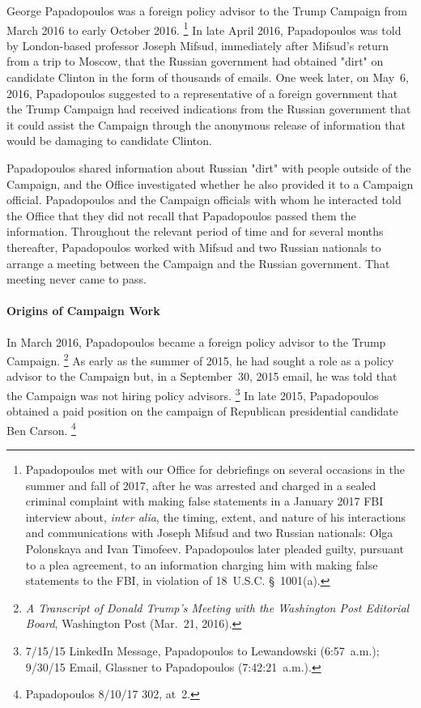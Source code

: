 George Papadopoulos was a foreign policy advisor to the Trump Campaign from March 2016 to early October 2016.%
\footnote{Papadopoulos met with our Office for debriefings on several occasions in the summer and fall of 2017, after he was arrested and charged in a sealed criminal complaint with making false statements in a January 2017 FBI interview about, \textit{inter alia}, the timing, extent, and nature of his interactions and communications with Joseph Mifsud and two Russian nationals: Olga Polonskaya and Ivan Timofeev.
Papadopoulos later pleaded guilty, pursuant to a plea agreement, to an information charging him with making false statements to the FBI, in violation of 18~U.S.C. \S~1001(a).}
In late April 2016, Papadopoulos was told by London-based professor Joseph Mifsud, immediately after Mifsud's return from a trip to Moscow, that the Russian government had obtained "dirt" on candidate Clinton in the form of thousands of emails.
One week later, on May~6, 2016, Papadopoulos suggested to a representative of a foreign government that the Trump Campaign had received indications from the Russian government that it could assist the Campaign through the anonymous release of information that would be damaging to candidate Clinton.

Papadopoulos shared information about Russian "dirt" with people outside of the Campaign, and the Office investigated whether he also provided it to a Campaign official.
Papadopoulos and the Campaign officials with whom he interacted told the Office that they did not recall that Papadopoulos passed them the information.
Throughout the relevant period of time and for several months thereafter, Papadopoulos worked with Mifsud and two Russian nationals to arrange a meeting between the Campaign and the Russian government.
That meeting never came to pass.

\paragraph{Origins of Campaign Work}

In March 2016, Papadopoulos became a foreign policy advisor to the Trump Campaign.%
\footnote{\textit{A Transcript of Donald Trump's Meeting with the Washington Post Editorial Board}, Washington Post (Mar.~21, 2016).}
As early as the summer of 2015, he had sought a role as a policy advisor to the Campaign but, in a September~30, 2015 email, he was told that the Campaign was not hiring policy advisors.%
\footnote{7/15/15 LinkedIn Message, Papadopoulos to Lewandowski (6:57~a.m.); 9/30/15 Email, Glassner to Papadopoulos (7:42:21~a.m.).}
In late 2015, Papadopoulos obtained a paid position on the campaign of Republican presidential candidate Ben Carson.%
\footnote{Papadopoulos 8/10/17 302, at~2.}

